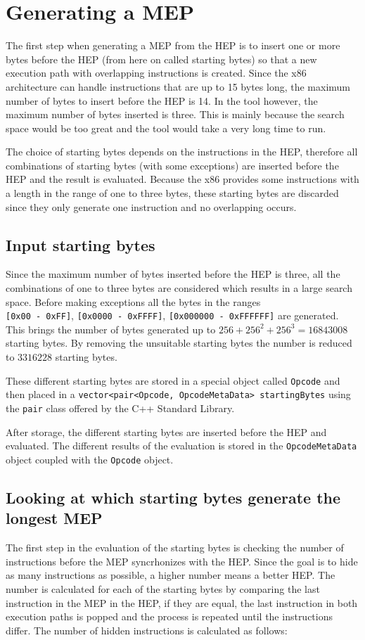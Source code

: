 \documentclass[11pt,twoside]{eitExjobb}
\begin{document}
\section{Generating a MEP}
The first step when generating a MEP from the HEP is to insert one or more bytes before the HEP (from here on called starting bytes) so that a new execution path with overlapping instructions is created. Since the x86 architecture can handle instructions that are up to 15 bytes long, the maximum number of bytes to insert before the HEP is 14. In the tool however, the maximum number of bytes inserted is three. This is mainly because the search space would be too great and the tool would take a very long time to run. 

The choice of starting bytes depends on the instructions in the HEP, therefore all combinations of starting bytes (with some exceptions) are inserted before the HEP and the result is evaluated. Because the x86 provides some instructions with a length in the range of one to three bytes, these starting bytes are discarded since they only generate one instruction and no overlapping occurs.


\subsection{Input starting bytes}
Since the maximum number of bytes inserted before the HEP is three, all the combinations of one to three bytes are considered which results in a large search space. Before making exceptions all the bytes in the ranges\\ 
\texttt{[0x00 - 0xFF]}, \texttt{[0x0000 - 0xFFFF]}, \texttt{[0x000000 - 0xFFFFFF]} are generated. This brings the number of bytes generated up to $256 + 256^2 + 256^3 = 16843008$ starting bytes. By removing the unsuitable starting bytes the number is reduced to $3316228$ starting bytes.

These different starting bytes are stored in a special object called \texttt{Opcode} and then placed in a \texttt{vector<pair<Opcode, OpcodeMetaData> startingBytes} using the \texttt{pair} class offered by the C++ Standard Library.

After storage, the different starting bytes are inserted before the HEP and evaluated. The different results of the evaluation is stored in the \texttt{OpcodeMetaData} object coupled with the \texttt{Opcode} object. 

\subsection{Looking at which starting bytes generate the longest MEP}
The first step in the evaluation of the starting bytes is checking the number of instructions before the MEP syncrhonizes with the HEP. Since the goal is to hide as many instructions as possible, a higher number means a better HEP. The number is calculated for each of the starting bytes by comparing the last instruction in the MEP in the HEP, if they are equal, the last instruction in both execution paths is popped and the process is repeated until the instructions differ. The number of hidden instructions is calculated as follows:
\end{document}
